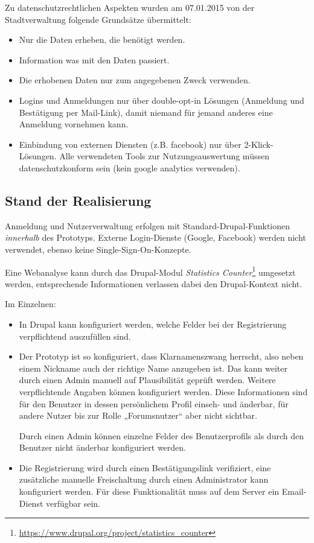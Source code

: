 \documentclass[11pt,a4paper,twoside]{article}
\begin{document}
Zu datenschutzrechtlichen Aspekten wurden am 07.01.2015 von der
Stadtverwaltung folgende Grundsätze übermittelt:
\begin{itemize}\itemsep0pt
\item Nur die Daten erheben, die benötigt werden.
\item Information was mit den Daten passiert.
\item Die erhobenen Daten nur zum angegebenen Zweck verwenden.
\item Logins und Anmeldungen nur über double-opt-in Lösungen (Anmeldung und
  Bestätigung per Mail-Link), damit niemand für jemand anderes eine Anmeldung
  vornehmen kann.
\item Einbindung von externen Diensten (z.B. facebook) nur über
  2-Klick-Lösungen.  Alle verwendeten Tools zur Nutzungsauswertung müssen
  datenschutzkonform sein (kein google analytics verwenden).
\end{itemize}

\subsection*{Stand der Realisierung}

Anmeldung und Nutzerverwaltung erfolgen mit Standard-Drupal-Funktionen
\emph{innerhalb} des Prototyps. Externe Login-Dienste (Google, Facebook)
werden nicht verwendet, ebenso keine Single-Sign-On-Konzepte. 

Eine Webanalyse kann durch das Drupal-Modul \emph{Statistics
  Counter}\footnote{\url{https://www.drupal.org/project/statistics_counter}}
umgesetzt werden, entsprechende Informationen verlassen dabei den
Drupal-Kontext nicht.

Im Einzelnen:
\begin{itemize}\itemsep0pt
\item In Drupal kann konfiguriert werden, welche Felder bei der Registrierung
  verpflichtend auszufüllen sind. 
\item Der Prototyp ist so konfiguriert, dass Klarnamenszwang herrscht, also
  neben einem Nickname auch der richtige Name anzugeben ist. Das kann weiter
  durch einen Admin manuell auf Plausibilität geprüft werden.  Weitere
  verpflichtende Angaben können konfiguriert werden. Diese Informationen sind
  für den Benutzer in dessen persönlichem Profil einseh- und änderbar, für
  andere Nutzer bis zur Rolle „Forumsnutzer“ aber nicht sichtbar.  

  Durch einen Admin können einzelne Felder des Benutzerprofils als durch den
  Benutzer nicht änderbar konfiguriert werden.
\item Die Registrierung wird durch einen Bestätigungslink verifiziert, eine
  zusätzliche manuelle Freischaltung durch einen Administrator kann
  konfiguriert werden. Für diese Funktionalität muss auf dem Server ein
  Email-Dienst verfügbar sein.
\end{itemize}
\end{document}
